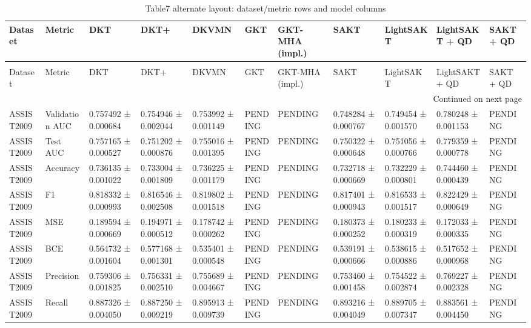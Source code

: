\begin{longtable}{lllllllllll}
\caption{Table7 alternate layout: dataset/metric rows and model columns} \\
\toprule
Dataset & Metric & DKT & DKT+ & DKVMN & GKT & GKT-MHA (impl.) & SAKT & LightSAKT & LightSAKT + QD & SAKT + QD \\
\midrule
\endfirsthead
\caption[]{Table7 alternate layout: dataset/metric rows and model columns} \\
\toprule
Dataset & Metric & DKT & DKT+ & DKVMN & GKT & GKT-MHA (impl.) & SAKT & LightSAKT & LightSAKT + QD & SAKT + QD \\
\midrule
\endhead
\midrule
\multicolumn{11}{r}{Continued on next page} \\
\midrule
\endfoot
\bottomrule
\endlastfoot
ASSIST2009 & Validation AUC & 0.757492 ± 0.000684 & 0.754946 ± 0.002044 & 0.753992 ± 0.001149 & PENDING & PENDING & 0.748284 ± 0.000767 & 0.749454 ± 0.001570 & 0.780248 ± 0.001153 & PENDING \\
ASSIST2009 & Test AUC & 0.757165 ± 0.000527 & 0.751202 ± 0.000876 & 0.755016 ± 0.001395 & PENDING & PENDING & 0.750322 ± 0.000648 & 0.751056 ± 0.000766 & 0.779359 ± 0.000778 & PENDING \\
ASSIST2009 & Accuracy & 0.736135 ± 0.001022 & 0.733004 ± 0.001809 & 0.736225 ± 0.001179 & PENDING & PENDING & 0.732718 ± 0.000669 & 0.732229 ± 0.000801 & 0.744460 ± 0.000439 & PENDING \\
ASSIST2009 & F1 & 0.818332 ± 0.000993 & 0.816546 ± 0.002508 & 0.819802 ± 0.001518 & PENDING & PENDING & 0.817401 ± 0.000943 & 0.816533 ± 0.001517 & 0.822429 ± 0.000649 & PENDING \\
ASSIST2009 & MSE & 0.189594 ± 0.000669 & 0.194971 ± 0.000512 & 0.178742 ± 0.000262 & PENDING & PENDING & 0.180373 ± 0.000252 & 0.180233 ± 0.000319 & 0.172033 ± 0.000335 & PENDING \\
ASSIST2009 & BCE & 0.564732 ± 0.001604 & 0.577168 ± 0.001301 & 0.535401 ± 0.000548 & PENDING & PENDING & 0.539191 ± 0.000666 & 0.538615 ± 0.000886 & 0.517652 ± 0.000968 & PENDING \\
ASSIST2009 & Precision & 0.759306 ± 0.001825 & 0.756331 ± 0.002510 & 0.755689 ± 0.004667 & PENDING & PENDING & 0.753460 ± 0.001458 & 0.754522 ± 0.002874 & 0.769227 ± 0.002328 & PENDING \\
ASSIST2009 & Recall & 0.887326 ± 0.004050 & 0.887250 ± 0.009219 & 0.895913 ± 0.009739 & PENDING & PENDING & 0.893216 ± 0.004049 & 0.889705 ± 0.007347 & 0.883561 ± 0.004450 & PENDING \\

\end{longtable}
